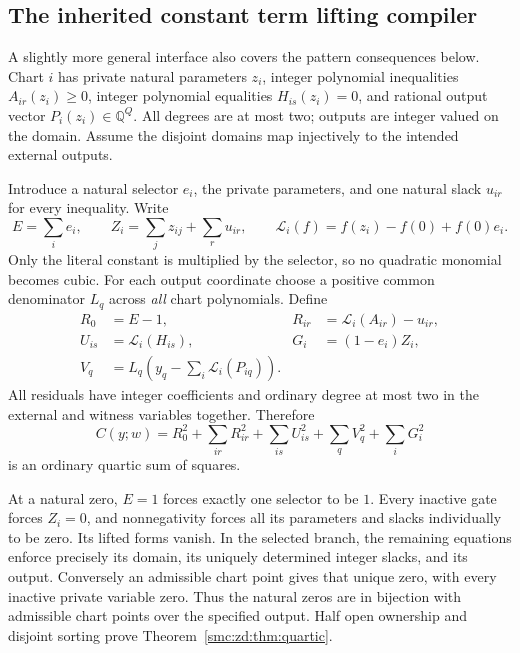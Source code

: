 \documentclass[11pt,letterpaper]{article}
\numberwithin{equation}{section}
\theoremstyle{definition}
\theoremstyle{remark}
\newcommand{\Q}{\mathbb Q}
\begin{document}
\subsection{The inherited constant term lifting compiler}
A slightly more general interface also covers the pattern consequences below. Chart $i$ has private natural parameters $z_i$, integer polynomial inequalities $A_{ir}(z_i)\ge0$, integer polynomial equalities $H_{is}(z_i)=0$, and rational output vector $P_i(z_i)\in\Q^Q$. All degrees are at most two; outputs are integer valued on the domain. Assume the disjoint domains map injectively to the intended external outputs.

Introduce a natural selector $e_i$, the private parameters, and one natural slack $u_{ir}$ for every inequality. Write
\[
 E=\sum_i e_i,\qquad Z_i=\sum_jz_{ij}+\sum_ru_{ir},\qquad
 \mathcal L_i(f)=f(z_i)-f(0)+f(0)e_i.
\]
Only the literal constant is multiplied by the selector, so no quadratic monomial becomes cubic. For each output coordinate choose a positive common denominator $L_q$ across \emph{all} chart polynomials. Define
\begin{align*}
 R_0&=E-1,&R_{ir}&=\mathcal L_i(A_{ir})-u_{ir},\\
 U_{is}&=\mathcal L_i(H_{is}),&G_i&=(1-e_i)Z_i,\\
 V_q&=L_q\left(y_q-\sum_i\mathcal L_i(P_{iq})\right).
\end{align*}
All residuals have integer coefficients and ordinary degree at most two in the external and witness variables together. Therefore
\begin{equation}\label{smc:zd:eq:sos}
 C(y;w)=R_0^2+\sum_{ir}R_{ir}^2+\sum_{is}U_{is}^2
             +\sum_qV_q^2+\sum_iG_i^2
\end{equation}
is an ordinary quartic sum of squares.

At a natural zero, $E=1$ forces exactly one selector to be $1$. Every inactive gate forces $Z_i=0$, and nonnegativity forces all its parameters and slacks individually to be zero. Its lifted forms vanish. In the selected branch, the remaining equations enforce precisely its domain, its uniquely determined integer slacks, and its output. Conversely an admissible chart point gives that unique zero, with every inactive private variable zero. Thus the natural zeros are in bijection with admissible chart points over the specified output. Half open ownership and disjoint sorting prove Theorem~\ref{smc:zd:thm:quartic}.
\end{document}
